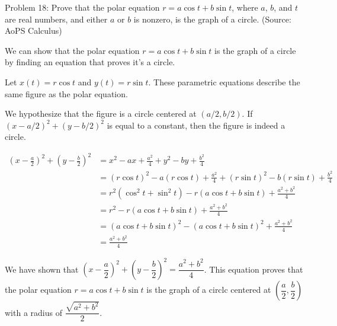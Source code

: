 Problem 18: Prove that the polar equation $r = a \cos t + b \sin t$, where $a$, $b$, and $t$ are real numbers, and either $a$ or $b$ is nonzero, is the graph of a circle. (Source: AoPS Calculus)

We can show that the polar equation $r = a \cos t + b \sin t$ is the graph of a circle by finding an equation that proves it's a circle.

Let $x(t) = r \cos t$ and $y(t) = r \sin t$. These parametric equations describe the same figure as the polar equation.

We hypothesize that the figure is a circle centered at $(a/2, b/2)$. If $(x - a/2)^2 + (y - b/2)^2$ is equal to a constant, then the figure is indeed a circle.

\begin{align*}
\left(x - \frac{a}{2}\right)^2 + \left(y - \frac{b}{2}\right)^2 &= x^2 - ax + \frac{a^2}{4} + y^2 - by + \frac{b^2}{4} \\
&= (r\cos t)^2 - a(r \cos t) + \frac{a^2}{4} + (r \sin t)^2 - b(r \sin t) + \frac{b^2}{4} \\
&= r^2(\cos^2 t + \sin^2 t) - r(a \cos t + b \sin t) + \frac{a^2 + b^2}{4} \\
&= r^2 - r(a \cos t + b \sin t) + \frac{a^2 + b^2}{4} \\
&= (a \cos t + b \sin t)^2 - (a \cos t + b \sin t)^2 + \frac{a^2 + b^2}{4} \\
&= \frac{a^2 + b^2}{4}
\end{align*}

We have shown that $\left(x - \dfrac{a}{2}\right)^2 + \left(y - \dfrac{b}{2}\right)^2 = \dfrac{a^2 + b^2}{4}$. This equation proves that the polar equation $r = a \cos t + b \sin t$ is the graph of a circlc centered at $\left(\dfrac{a}{2}, \dfrac{b}{2}\right)$ with a radius of $\dfrac{\sqrt{a^2 + b^2}}{2}$.
